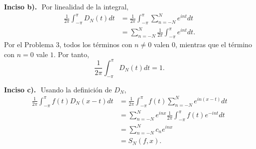 \documentclass[11pt,letterpaper]{article}
\begin{document}
\vspace{0.3cm}

\textbf{Inciso b).}\,\
Por linealidad de la integral,
\begin{align*}
    \frac{1}{2\pi}\int_{-\pi}^{\pi}D_N(t)dt
    &=\frac{1}{2\pi}\int_{-\pi}^{\pi}\sum_{n=-N}^{N}e^{int}dt \\
    &=\sum_{n=-N}^{N}\frac{1}{2\pi}\int_{-\pi}^{\pi}e^{int}dt.
\end{align*}
Por el Problema 3, todos los términos con $n\neq0$ valen $0$, mientras que el término con $n=0$ vale $1$. Por tanto,
\begin{equation*}
    \frac{1}{2\pi}\int_{-\pi}^{\pi}D_N(t)dt=1.
\end{equation*}

\vspace{0.3cm}

\textbf{Inciso c).}\,\
Usando la definición de $D_N$,
\begin{align*}
    \frac{1}{2\pi}\int_{-\pi}^{\pi}f(t)D_N(x-t)dt
    &=\frac{1}{2\pi}\int_{-\pi}^{\pi}f(t)\sum_{n=-N}^{N}e^{in(x-t)}dt \\
    &=\sum_{n=-N}^{N}e^{inx}\frac{1}{2\pi}\int_{-\pi}^{\pi}f(t)e^{-int}dt \\
    &=\sum_{n=-N}^{N}c_ne^{inx} \\
    &=S_N(f,x).
\end{align*}

\vspace{0.3cm}
\end{document}
